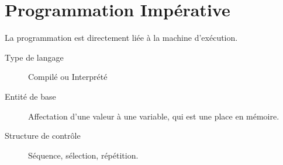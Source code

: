		\section{Programmation Impérative}\label{imperative}
			La programmation est directement liée à la machine d'exécution.
			\begin{description}	
				\item[Type de langage] Compilé ou Interprété
				\item[Entité de base] Affectation d'une valeur à une variable, qui est une place en mémoire.
				\item[Structure de contrôle] Séquence, sélection, répétition.
			\end{description}

